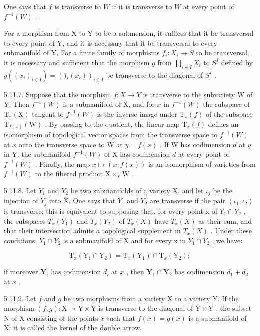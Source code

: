 One says that \(f\) is transverse to \(W\) if it is transverse to \(W\) at every point of \(f^{-1}(W)\) .

For a morphism from X to Y to be a submersion, it suffices that it be transversal to every point of Y, and it is necessary that it be transversal to every submanifold of Y. For a finite family of morphisms \(f_{i}:X_{i}\to S\) to be transversal, it is necessary and sufficient that the morphism \(g\) from \(\prod_{i\in I}X_{i}\) to \(S^{I}\) defined by \(g((x_{i})_{i\in I})=(f_{i}(x_{i}))_{i\in I}\) be transverse to the diagonal of \(S^{I}\) .

5.11.7. Suppose that the morphism \(f:X\to Y\) is transverse to the subvariety W of Y. Then \(f^{-1}(W)\) is a submanifold of X, and for \(x\) in \(f^{-1}(W)\) the subspace of \(\mathrm{T}_{x}(\mathrm{X})\) tangent to \(f^{-1}(W)\) is the inverse image under \(\mathrm{T}_{x}(f)\) of the subspace \(\mathrm{T}_{f(x)}(\mathrm{W})\) . By passing to the quotient, the linear map \(\mathrm{T}_{x}(f)\) defines an isomorphism of topological vector spaces from the transverse space to \(f^{-1}(W)\) at \(x\) onto the transverse space to W at \(y=f(x)\) . If W has codimension \(d\) at \(y\) in Y, the submanifold \(f^{-1}(W)\) of X has codimension \(d\) at every point of \(f^{-1}(W)\) . Finally, the map \(x\mapsto(x,f(x))\) is an isomorphism of varieties from \(f^{-1}(W)\) to the fibered product \(\mathrm{X}\times_{\mathrm{Y}}\mathrm{W}\) .

5.11.8. Let \(Y_{1}\) and \(Y_{2}\) be two submanifolds of a variety X, and let \(\iota_{j}\) be the injection of \(Y_{j}\) into X. One says that \(Y_{1}\) and \(Y_{2}\) are transverse if the pair \((\iota_{1},\iota_{2})\) is transverse; this is equivalent to supposing that, for every point x of \(Y_{1}\cap Y_{2}\) , the subspaces \(T_{x}(Y_{1})\) and \(T_{x}(Y_{2})\) of \(T_{x}(X)\) have \(T_{x}(X)\) as their sum, and that their intersection admits a topological supplement in \(T_{x}(X)\) . Under these conditions, \(Y_{1}\cap Y_{2}\) is a submanifold of X and for every x in \(Y_{1}\cap Y_{2}\) , we have:

\[
\mathrm{T} _ {x} (\mathrm{Y} _ {1} \cap \mathrm{Y} _ {2}) = \mathrm{T} _ {x} (\mathrm{Y} _ {1}) \cap \mathrm{T} _ {x} (\mathrm{Y} _ {2});
\]

if moreover \(\mathbf{Y}_i\) has codimension \(d_i\) at \(x\) , then \(\mathbf{Y}_1 \cap \mathbf{Y}_2\) has codimension \(d_1 + d_2\) at \(x\) .

5.11.9. Let \(f\) and \(g\) be two morphisms from a variety X to a variety Y. If the morphism \((f,g):\mathrm{X}\to\mathrm{Y}\times\mathrm{Y}\) is transverse to the diagonal of \(\mathrm{Y}\times\mathrm{Y}\) , the subset N of X consisting of the points \(x\) such that \(f(x)=g(x)\) is a submanifold of X; it is called the kernel of the double arrow.

